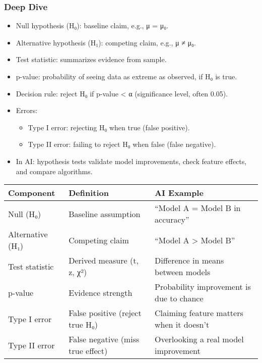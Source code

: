 \documentclass[
  letterpaper,
  DIV=11,
  numbers=noendperiod]{scrreprt}
\providecommand{\tightlist}{%
  \setlength{\itemsep}{0pt}\setlength{\parskip}{0pt}}
\begin{document}
\subsubsection{Deep Dive}\label{deep-dive-135}

\begin{itemize}
\item
  Null hypothesis (H₀): baseline claim, e.g., μ = μ₀.
\item
  Alternative hypothesis (H₁): competing claim, e.g., μ ≠ μ₀.
\item
  Test statistic: summarizes evidence from sample.
\item
  p-value: probability of seeing data as extreme as observed, if H₀ is
  true.
\item
  Decision rule: reject H₀ if p-value \textless{} α (significance level,
  often 0.05).
\item
  Errors:

  \begin{itemize}
  \tightlist
  \item
    Type I error: rejecting H₀ when true (false positive).
  \item
    Type II error: failing to reject H₀ when false (false negative).
  \end{itemize}
\item
  In AI: hypothesis tests validate model improvements, check feature
  effects, and compare algorithms.
\end{itemize}

\begin{longtable}[]{@{}
  >{\raggedright\arraybackslash}p{}
  >{\raggedright\arraybackslash}p{}
  >{\raggedright\arraybackslash}p{}@{}}
\toprule\noalign{}
\begin{minipage}[b]{\linewidth}\raggedright
Component
\end{minipage} & \begin{minipage}[b]{\linewidth}\raggedright
Definition
\end{minipage} & \begin{minipage}[b]{\linewidth}\raggedright
AI Example
\end{minipage} \\
\midrule\noalign{}
\endhead
\bottomrule\noalign{}
\endlastfoot
Null (H₀) & Baseline assumption & ``Model A = Model B in accuracy'' \\
Alternative (H₁) & Competing claim & ``Model A \textgreater{} Model
B'' \\
Test statistic & Derived measure (t, z, χ²) & Difference in means
between models \\
p-value & Evidence strength & Probability improvement is due to
chance \\
Type I error & False positive (reject true H₀) & Claiming feature
matters when it doesn't \\
Type II error & False negative (miss true effect) & Overlooking a real
model improvement \\
\end{longtable}
\end{document}
